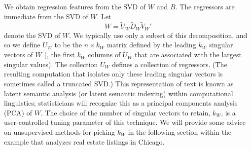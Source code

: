 \documentclass[12pt]{article}
\begin{document}
 We obtain regression features from the SVD of $W$ and $B$.  The regressors are immediate from the SVD of $W$.    Let
 \begin{equation}
     W = \tilde{U}_W \tilde{D}_W \tilde{V}_W'   
 \label{eq:svdW}
 \end{equation}
 denote the SVD of $W$. We typically use only a subset of this decomposition, and so  we define $U_W$ to be the $n \times k_W$ matrix defined by the leading $k_W$ singular vectors of $W$ (\ie, the first $k_W$ columns of $\tilde{U}_W$ that are associated with the largest singular values).  The collection $U_W$ defines a collection of regressors.  (The resulting computation that isolates only these leading singular vectors is sometimes called a truncated SVD.)  This representation of text is known as latent semantic analysis (or latent semantic indexing) within computational linguistics; statisticians will recognize this as a principal components analysis (PCA) of $W$.   The choice of the number of singular vectors to retain, $k_W$, is a user-controlled tuning parameter of this technique.  We will provide some advice on unsupervised methods for picking $k_W$ in the following section within the example that analyzes real estate listings in Chicago.  
\end{document}
